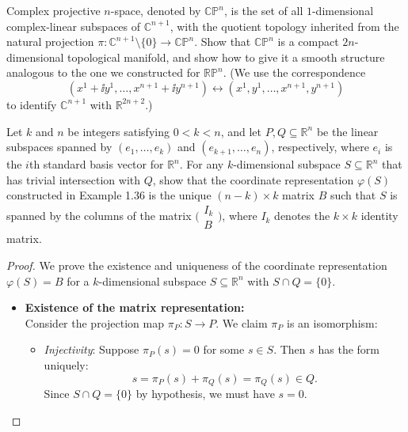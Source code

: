 \begin{problem}
  Complex projective $n$-space, denoted by $\mathbb{CP}^n$, is the set of all $1$-dimensional 
  complex-linear subspaces of $\mathbb{C}^{n+1}$, with the quotient topology inherited 
  from the natural projection $\pi \colon \mathbb{C}^{n+1} \setminus \{0\} \to \mathbb{CP}^n$. 
  Show that $\mathbb{CP}^n$ is a compact $2n$-dimensional topological manifold, and show how to give it a 
  smooth structure analogous to the one we constructed for $\mathbb{RP}^n$. (We use the 
  correspondence
  $$ (x^1 + \ii y^1, \dots, x^{n+1} + \ii y^{n+1}) \leftrightarrow (x^1, y^1, \dots, x^{n+1}, y^{n+1}) $$
  to identify $\mathbb{C}^{n+1}$ with $\mathbb{R}^{2n+2}$.)
\end{problem}

\begin{problem}
  Let $k$ and $n$ be integers satisfying $0 < k < n$, and let $P, Q \subseteq \mathbb{R}^n$ be the linear subspaces spanned by $(e_1,\dots,e_k)$ and $(e_{k+1},\dots,e_n)$, respectively, where $e_i$ is the $i$th standard basis vector for $\mathbb{R}^n$. For any $k$-dimensional subspace $S \subseteq \mathbb{R}^n$ that has trivial intersection with $Q$, show that the coordinate representation $\varphi(S)$ constructed in Example 1.36 is the unique $(n-k) \times k$ matrix $B$ such that $S$ is spanned by the columns of the matrix $\bigl(
    \begin{smallmatrix} I_k \\ B \end{smallmatrix}
    \bigr)$, where $I_k$ denotes the $k \times k$ identity matrix.
    \begin{proof}
      We prove the existence and uniqueness of the coordinate representation $\varphi(S) = B$ for a $k$-dimensional subspace $S \subseteq \mathbb{R}^n$ with $S \cap Q = \{0\}$.
      \begin{itemize}
        \item \textbf{Existence of the matrix representation:} \\
        Consider the projection map $\pi_P\colon S \to P$. We claim $\pi_P$ is an isomorphism:
        \begin{itemize}
          \item \textit{Injectivity}: Suppose $\pi_P(s) = 0$ for some $s \in S$. Then $s$ has the form uniquely:
          \begin{equation*}
            s = \pi_P(s) + \pi_Q(s) = \pi_Q(s) \in Q.
          \end{equation*}
          Since $S \cap Q = \{0\}$ by hypothesis, we must have $s = 0$.

\end{itemize}
\end{itemize}
\end{proof}
\end{problem}
